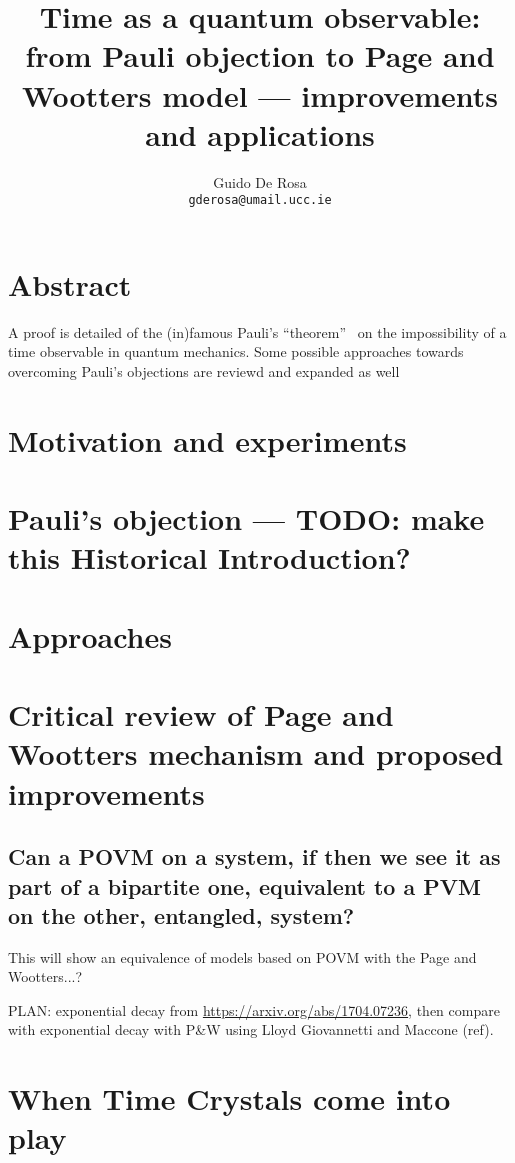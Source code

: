 \documentclass{book}
\author{Guido De Rosa \\ \small\tt{gderosa@umail.ucc.ie}}
\title{Time as a quantum observable: from Pauli objection to Page and Wootters model --- improvements and applications}
\begin{document}
\maketitle

\tableofcontents

\chapter*{Abstract}
A proof is detailed of the (in)famous Pauli's ``theorem''~\cite{PauliFootnote}
on the impossibility of a time observable in quantum mechanics. Some possible
approaches towards overcoming Pauli's objections are reviewd and expanded as well

\chapter{Motivation and experiments}


\chapter{Pauli's objection --- TODO: make this Historical Introduction?}



\chapter{Approaches}


\chapter{Critical review of Page and Wootters mechanism and proposed improvements}


\section{Can a POVM on a system, if then we see it as part of a bipartite one, equivalent to a PVM on the other, entangled, system?}
This will show an equivalence of models based on POVM with the Page and Wootters...?

PLAN: exponential decay from \url{https://arxiv.org/abs/1704.07236},
then compare with exponential decay with P&W using Lloyd Giovannetti and Maccone (ref).

\chapter{When Time Crystals come into play}

\end{document}

